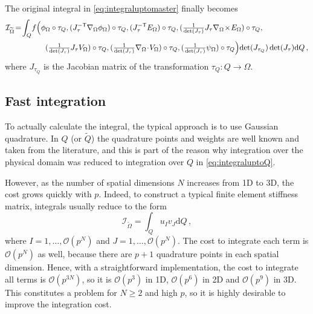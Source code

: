 
The original integral in \eqref{eq:integraluptomaster} finally becomes
\begin{equation}
	\begin{aligned}
		\mathcal{I}_{\tilde{\Omega}}
			&\!=\!\int_{Q}\!f\Big(\phi_{\Omega}\circ\tau_Q,(J_\tau^{-\T}\nabla_{\Omega}\phi_{\Omega})\circ\tau_Q,
				(J_\tau^{-\T}E_{\Omega})\circ\tau_Q,(\textstyle{\frac{1}{\det(J_\tau)}}J_\tau\nabla_{\Omega}\!\times\!E_{\Omega})\circ\tau_Q,\\
					&\qquad\qquad
						(\textstyle{\frac{1}{\det(J_\tau)}}J_\tau V_{\Omega})\circ\tau_Q,
							(\textstyle{\frac{1}{\det(J_\tau)}}\nabla_{\Omega}\!\cdot\!V_{\Omega})\circ\tau_Q,
								(\textstyle{\frac{1}{\det(J_\tau)}}\psi_{\Omega})\circ\tau_Q\Big)\!\det(J_{\tau_Q})\det(J_\tau)\mathrm{d}Q\,,
	\end{aligned}
	\label{eq:integraluptoQ}
\end{equation}
where $J_{\tau_Q}$ is the Jacobian matrix of the transformation $\tau_Q:Q\rightarrow\Omega$.

\subsection{Fast integration}

To actually calculate the integral, the typical approach is to use Gaussian quadrature.
In $Q$ (or $\tilde{Q}$) the quadrature points and weights are well known and taken from the literature, and this is part of the reason why integration over the physical domain was reduced to integration over $Q$ in \eqref{eq:integraluptoQ}.

However, as the number of spatial dimensions $N$ increases from 1D to 3D, the cost grows quickly with $p$.
Indeed, to construct a typical finite element stiffness matrix, integrals usually reduce to the form
\begin{equation*}
	\mathcal{I}_{\tilde{\Omega}}=\int_{Q}u_Iv_J\mathrm{d}Q\,,
\end{equation*}
where $I=1,\ldots,\mathcal{O}(p^N)$ and $J=1,\ldots,\mathcal{O}(p^N)$.
The cost to integrate each term is $\mathcal{O}(p^N)$ as well, because there are $p+1$ quadrature points in each spatial dimension.
Hence, with a straightforward implementation, the cost to integrate all terms is $\mathcal{O}(p^{3N})$, so it is $\mathcal{O}(p^3)$ in 1D, $\mathcal{O}(p^6)$ in 2D and $\mathcal{O}(p^9)$ in 3D.
This constitutes a problem for $N\geq2$ and high $p$, so it is highly desirable to improve the integration cost.

